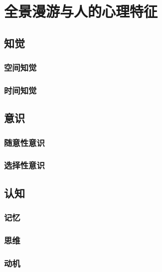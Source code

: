 \section{全景漫游与人的心理特征}

\subsection{知觉}
\subsubsection{空间知觉}
\subsubsection{时间知觉}

\subsection{意识}
\subsubsection{随意性意识}
\subsubsection{选择性意识}

\subsection{认知}
\subsubsection{记忆}
\subsubsection{思维}
\subsubsection{动机}